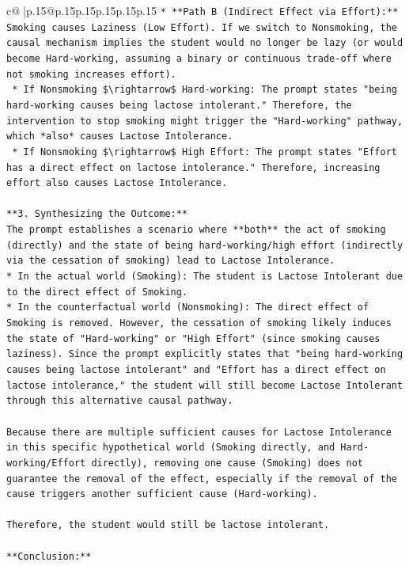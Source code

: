 \documentclass{article}
\begin{document}
{\begin{supertabular}{c@{$\;$}|p{.15\linewidth}@{}p{.15\linewidth}p{.15\linewidth}p{.15\linewidth}p{.15\linewidth}p{.15\linewidth}}
{{{\texttt{*   **Path B (Indirect Effect via Effort):** Smoking causes Laziness (Low Effort). If we switch to Nonsmoking, the causal mechanism implies the student would no longer be lazy (or would become Hard{-}working, assuming a binary or continuous trade{-}off where not smoking increases effort).} \\
\texttt{    *   If Nonsmoking \$\textbackslash{}rightarrow\$ Hard{-}working: The prompt states "being hard{-}working causes being lactose intolerant." Therefore, the intervention to stop smoking might trigger the "Hard{-}working" pathway, which *also* causes Lactose Intolerance.} \\
\texttt{    *   If Nonsmoking \$\textbackslash{}rightarrow\$ High Effort: The prompt states "Effort has a direct effect on lactose intolerance." Therefore, increasing effort also causes Lactose Intolerance.} \\
\\ 
\texttt{**3. Synthesizing the Outcome:**} \\
\texttt{The prompt establishes a scenario where **both** the act of smoking (directly) and the state of being hard{-}working/high effort (indirectly via the cessation of smoking) lead to Lactose Intolerance.} \\
\texttt{*   In the actual world (Smoking): The student is Lactose Intolerant due to the direct effect of Smoking.} \\
\texttt{*   In the counterfactual world (Nonsmoking): The direct effect of Smoking is removed. However, the cessation of smoking likely induces the state of "Hard{-}working" or "High Effort" (since smoking causes laziness). Since the prompt explicitly states that "being hard{-}working causes being lactose intolerant" and "Effort has a direct effect on lactose intolerance," the student will still become Lactose Intolerant through this alternative causal pathway.} \\
\\ 
\texttt{Because there are multiple sufficient causes for Lactose Intolerance in this specific hypothetical world (Smoking directly, and Hard{-}working/Effort directly), removing one cause (Smoking) does not guarantee the removal of the effect, especially if the removal of the cause triggers another sufficient cause (Hard{-}working).} \\
\\ 
\texttt{Therefore, the student would still be lactose intolerant.} \\
\\ 
\texttt{**Conclusion:**} \\
}}}
\end{supertabular}}
\end{document}
